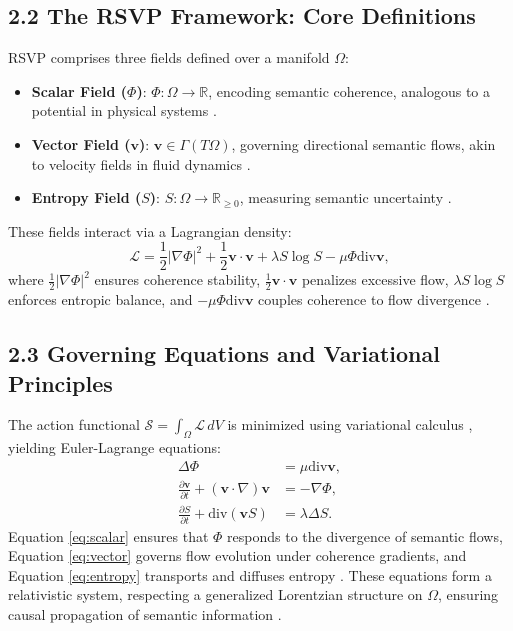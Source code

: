 \documentclass[12pt]{article}
\begin{document}
\subsection{2.2 The RSVP Framework: Core Definitions}

RSVP comprises three fields defined over a manifold \(\Omega\):
\begin{itemize}
    \item \textbf{Scalar Field (\(\Phi\))}: \(\Phi: \Omega \to \mathbb{R}\), encoding semantic coherence, analogous to a potential in physical systems \citep{gromov1999}.
    \item \textbf{Vector Field (\(\mathbf{v}\))}: \(\mathbf{v} \in \Gamma(T\Omega)\), governing directional semantic flows, akin to velocity fields in fluid dynamics \citep{baez2011}.
    \item \textbf{Entropy Field (\(S\))}: \(S: \Omega \to \mathbb{R}_{\geq 0}\), measuring semantic uncertainty \citep{shannon1948}.
\end{itemize}

These fields interact via a Lagrangian density:
\[
\mathcal{L} = \frac{1}{2} |\nabla \Phi|^2 + \frac{1}{2} \mathbf{v} \cdot \mathbf{v} + \lambda S \log S - \mu \Phi \text{div} \mathbf{v},
\]
where \(\frac{1}{2} |\nabla \Phi|^2\) ensures coherence stability, \(\frac{1}{2} \mathbf{v} \cdot \mathbf{v}\) penalizes excessive flow, \(\lambda S \log S\) enforces entropic balance, and \(-\mu \Phi \text{div} \mathbf{v}\) couples coherence to flow divergence \citep{atiyah1969}.

\subsection{2.3 Governing Equations and Variational Principles}

The action functional \(\mathcal{S} = \int_{\Omega} \mathcal{L} \, dV\) is minimized using variational calculus \citep{atiyah1969}, yielding Euler-Lagrange equations:
\begin{align}
\Delta \Phi &= \mu \text{div} \mathbf{v}, \label{eq:scalar} \\
\frac{\partial \mathbf{v}}{\partial t} + (\mathbf{v} \cdot \nabla) \mathbf{v} &= -\nabla \Phi, \label{eq:vector} \\
\frac{\partial S}{\partial t} + \text{div} (\mathbf{v} S) &= \lambda \Delta S. \label{eq:entropy}
\end{align}
Equation \eqref{eq:scalar} ensures that \(\Phi\) responds to the divergence of semantic flows, Equation \eqref{eq:vector} governs flow evolution under coherence gradients, and Equation \eqref{eq:entropy} transports and diffuses entropy \citep{gromov1999}. These equations form a relativistic system, respecting a generalized Lorentzian structure on \(\Omega\), ensuring causal propagation of semantic information \citep{baez2011}.
\end{document}
